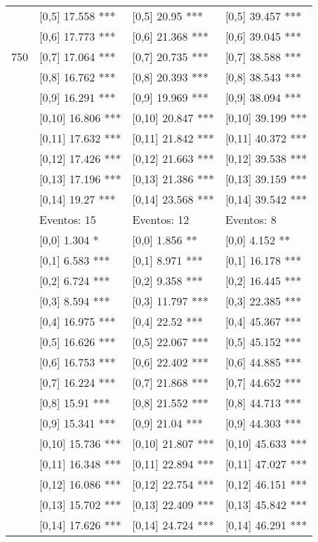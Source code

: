 \begin{table}
\begin{tabular}[t]{llll}
 & {}[0,5] 17.558 *** & {}[0,5] 20.95 *** & {}[0,5] 39.457 ***\\
 & {}[0,6] 17.773 *** & {}[0,6] 21.368 *** & {}[0,6] 39.045 ***\\
750 & {}[0,7] 17.064 *** & {}[0,7] 20.735 *** & {}[0,7] 38.588 ***\\
\addlinespace
 & {}[0,8] 16.762 *** & {}[0,8] 20.393 *** & {}[0,8] 38.543 ***\\
 & {}[0,9] 16.291 *** & {}[0,9] 19.969 *** & {}[0,9] 38.094 ***\\
 & {}[0,10] 16.806 *** & {}[0,10] 20.847 *** & {}[0,10] 39.199 ***\\
 & {}[0,11] 17.632 *** & {}[0,11] 21.842 *** & {}[0,11] 40.372 ***\\
 & {}[0,12] 17.426 *** & {}[0,12] 21.663 *** & {}[0,12] 39.538 ***\\
\addlinespace
 & {}[0,13] 17.196 *** & {}[0,13] 21.386 *** & {}[0,13] 39.159 ***\\
 & {}[0,14] 19.27 *** & {}[0,14] 23.568 *** & {}[0,14] 39.542 ***\\
 & Eventos:  15 & Eventos:  12 & Eventos:  8\\
 & {}[0,0] 1.304 * & {}[0,0] 1.856 ** & {}[0,0] 4.152 **\\
 & {}[0,1] 6.583 *** & {}[0,1] 8.971 *** & {}[0,1] 16.178 ***\\
\addlinespace
 & {}[0,2] 6.724 *** & {}[0,2] 9.358 *** & {}[0,2] 16.445 ***\\
 & {}[0,3] 8.594 *** & {}[0,3] 11.797 *** & {}[0,3] 22.385 ***\\
 & {}[0,4] 16.975 *** & {}[0,4] 22.52 *** & {}[0,4] 45.367 ***\\
 & {}[0,5] 16.626 *** & {}[0,5] 22.067 *** & {}[0,5] 45.152 ***\\
 & {}[0,6] 16.753 *** & {}[0,6] 22.402 *** & {}[0,6] 44.885 ***\\
\addlinespace
1000 & {}[0,7] 16.224 *** & {}[0,7] 21.868 *** & {}[0,7] 44.652 ***\\
 & {}[0,8] 15.91 *** & {}[0,8] 21.552 *** & {}[0,8] 44.713 ***\\
 & {}[0,9] 15.341 *** & {}[0,9] 21.04 *** & {}[0,9] 44.303 ***\\
 & {}[0,10] 15.736 *** & {}[0,10] 21.807 *** & {}[0,10] 45.633 ***\\
 & {}[0,11] 16.348 *** & {}[0,11] 22.894 *** & {}[0,11] 47.027 ***\\
\addlinespace
 & {}[0,12] 16.086 *** & {}[0,12] 22.754 *** & {}[0,12] 46.151 ***\\
 & {}[0,13] 15.702 *** & {}[0,13] 22.409 *** & {}[0,13] 45.842 ***\\
 & {}[0,14] 17.626 *** & {}[0,14] 24.724 *** & {}[0,14] 46.291 ***\\
\bottomrule
\end{tabular}
\end{table}

